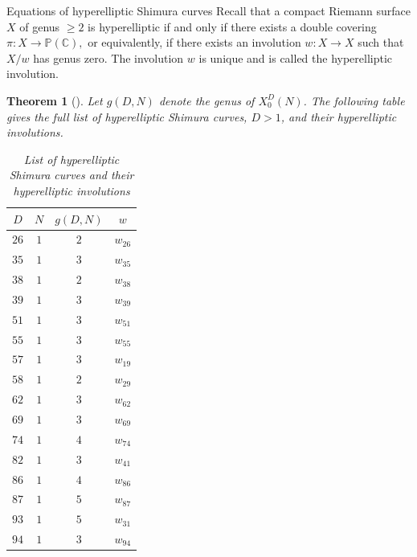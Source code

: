 \documentclass{amsart}
\newtheorem{theorem}{Theorem}
\theoremstyle{definition}
\begin{document}
\begin{section}{Equations of hyperelliptic Shimura curves}
\label{section: equations}
Recall that a compact Riemann surface $X$ of genus $\ge 2$ is
hyperelliptic if and only if there exists a double covering $\pi:
X\rightarrow \mathbb{P}(\mathbb{C}),$ or equivalently, if there exists
an involution $w:X\rightarrow X$ such that $X/w$ has genus zero.
The involution $w$ is unique and is called the hyperelliptic
involution.

\begin{theorem}[{\cite[Theorems 7 and 8]{Ogg}}]
Let $g(D,N)$ denote the genus of $X^D_0(N)$. The following table gives the
full list of hyperelliptic Shimura curves, $D>1$, and their hyperelliptic
involutions.

\renewcommand{\arraystretch}{1}
\tabcolsep=10pt                         
\begin{table}[htb]
\caption{List of hyperelliptic Shimura curves and their hyperelliptic involutions} \label{table: curves}
\newcommand{\tabincell}[2]{\begin{tabular}{@{}#1@{}}#2\end{tabular}}
  \centering
\begin{minipage}[b]{0.45\linewidth}\centering
\begin{tabular}{|c|c|c|c|}
\hline
$D$&$N$&$g(D,N)$&$w$\\
\hline
$26$&$1$&$2$&$w_{26}$\\
\hline
$35$&$1$&$3$&$w_{35}$\\
\hline
$38$&$1$&$2$&$w_{38}$\\
\hline
$39$&$1$&$3$&$w_{39}$\\
\hline
$51$&$1$&$3$&$w_{51}$\\
\hline
$55$&$1$&$3$&$w_{55}$\\
\hline
$57$&$1$&$3$&$w_{19}$\\
\hline
$58$&$1$&$2$&$w_{29}$\\
\hline
$62$&$1$&$3$&$w_{62}$\\
\hline
$69$&$1$&$3$&$w_{69}$\\
\hline
$74$&$1$&$4$&$w_{74}$\\
\hline
$82$&$1$&$3$&$w_{41}$\\
\hline
$86$&$1$&$4$&$w_{86}$\\
\hline
$87$&$1$&$5$&$w_{87}$\\
\hline
$93$&$1$&$5$&$w_{31}$\\
\hline

$94$&$1$&$3$&$w_{94}$\\
\hline


\end{tabular}
\end{minipage}
\end{table}
\end{theorem}
\end{section}
\end{document}
